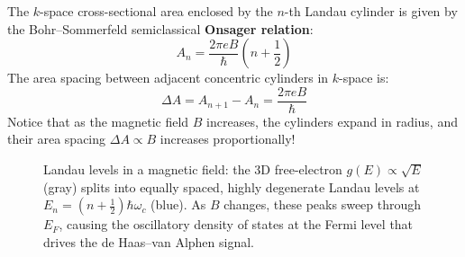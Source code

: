 \documentclass[11pt,a4paper]{article}
\begin{document}
The $k$-space cross-sectional area enclosed by the $n$-th Landau cylinder is given by the Bohr--Sommerfeld semiclassical \textbf{Onsager relation}:
\begin{equation}
\boxed{A_n = \frac{2\pi e B}{\hbar}\left(n + \frac{1}{2}\right)}
\label{eq:onsager_relation}
\end{equation}
The area spacing between adjacent concentric cylinders in $k$-space is:
\begin{equation}
\Delta A = A_{n+1} - A_n = \frac{2\pi e B}{\hbar}
\label{eq:landau_area_spacing}
\end{equation}
Notice that as the magnetic field $B$ increases, the cylinders expand in radius, and their area spacing $\Delta A \propto B$ increases proportionally!

\begin{figure}[h]
\centering
{}
\caption{Landau levels in a magnetic field: the 3D free-electron $g(E)\propto\sqrt{E}$ (gray) splits into equally spaced, highly degenerate Landau levels at $E_n=(n+\tfrac12)\hbar\omega_c$ (blue). As $B$ changes, these peaks sweep through $E_F$, causing the oscillatory density of states at the Fermi level that drives the de Haas--van Alphen signal.}
\label{fig:landau}
\end{figure}
\end{document}

